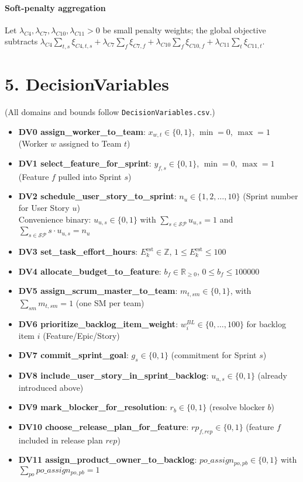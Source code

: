 \documentclass[11pt,a4paper]{article}
\begin{document}
\paragraph{Soft-penalty aggregation}
Let $\lambda_{C4},\lambda_{C7},\lambda_{C10},\lambda_{C11}>0$ be small penalty weights; the global objective subtracts
$\lambda_{C4}\sum_{t,s}\xi_{C4,t,s}+\lambda_{C7}\sum_f \xi_{C7,f}+\lambda_{C10}\sum_f \xi_{C10,f}+\lambda_{C11}\sum_t \xi_{C11,t}$.

\section{5. DecisionVariables}
(All domains and bounds follow \texttt{DecisionVariables.csv}.)

\begin{itemize}[leftmargin=2.2em]
  \item \textbf{DV0 assign\_worker\_to\_team}:\; $x_{w,t}\in\{0,1\}$, $\min=0$, $\max=1$ \hfill (Worker $w$ assigned to Team $t$)
  \item \textbf{DV1 select\_feature\_for\_sprint}:\; $y_{f,s}\in\{0,1\}$, $\min=0$, $\max=1$ \hfill (Feature $f$ pulled into Sprint $s$)
  \item \textbf{DV2 schedule\_user\_story\_to\_sprint}:\; $n_{u}\in\{1,2,\dots,10\}$ \hfill (Sprint number for User Story $u$) \\
        Convenience binary: $u_{u,s}\in\{0,1\}$ with $\sum_{s\in\mathcal{SP}} u_{u,s}=1$ and $\sum_{s\in\mathcal{SP}} s\cdot u_{u,s}=n_u$
  \item \textbf{DV3 set\_task\_effort\_hours}:\; $E^{\text{est}}_{k}\in\mathbb{Z}$, $1\le E^{\text{est}}_{k}\le 100$
  \item \textbf{DV4 allocate\_budget\_to\_feature}:\; $b_f\in\mathbb{R}_{\ge 0}$, $0\le b_f\le 100000$
  \item \textbf{DV5 assign\_scrum\_master\_to\_team}:\; $m_{t,sm}\in\{0,1\}$, with $\sum_{sm} m_{t,sm}=1$ (one SM per team)
  \item \textbf{DV6 prioritize\_backlog\_item\_weight}:\; $w^{BL}_i\in\{0,\dots,100\}$ for backlog item $i$ (Feature/Epic/Story)
  \item \textbf{DV7 commit\_sprint\_goal}:\; $g_s\in\{0,1\}$ (commitment for Sprint $s$)
  \item \textbf{DV8 include\_user\_story\_in\_sprint\_backlog}:\; $u_{u,s}\in\{0,1\}$ (already introduced above)
  \item \textbf{DV9 mark\_blocker\_for\_resolution}:\; $r_b\in\{0,1\}$ (resolve blocker $b$)
  \item \textbf{DV10 choose\_release\_plan\_for\_feature}:\; $rp_{f,rep}\in\{0,1\}$ (feature $f$ included in release plan $rep$)
  \item \textbf{DV11 assign\_product\_owner\_to\_backlog}:\; $po\_assign_{po,pb}\in\{0,1\}$ with $\sum_{po} po\_assign_{po,pb}=1$
\end{itemize}
\end{document}
